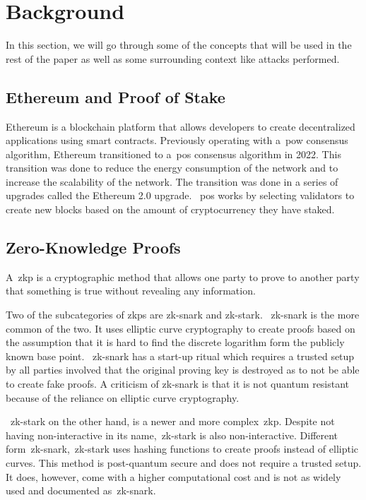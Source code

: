 
\section{Background}\label{sec:background}
In this section, we will go through some of the concepts that will be used in the rest of the paper as well as some surrounding context like attacks performed.

\subsection{Ethereum and Proof of Stake}\label{subsec:ethereum-and-proof-of-stake}
Ethereum is a blockchain platform that allows developers to create decentralized applications using smart contracts.
Previously operating with a~\gls{pow} consensus algorithm, Ethereum transitioned to a~\gls{pos} consensus algorithm in 2022.
This transition was done to reduce the energy consumption of the network and to increase the scalability of the network.
The transition was done in a series of upgrades called the Ethereum 2.0 upgrade.
~\gls{pos} works by selecting validators to create new blocks based on the amount of cryptocurrency they have staked.

\subsection{Zero-Knowledge Proofs}\label{subsec:zero-knowledge-proofs}
A~\gls{zkp} is a cryptographic method that allows one party to prove to another party that something is true without revealing any information.

Two of the subcategories of \gls{zkp}s are \gls{zk-snark} and \gls{zk-stark}.
~\gls{zk-snark} is the more common of the two.
It uses elliptic curve cryptography to create proofs based on the assumption that it is hard to find the discrete logarithm form the publicly known base point.
~\gls{zk-snark} has a start-up ritual which requires a trusted setup by all parties involved that the original proving key is destroyed as to not be able to create fake proofs.
A criticism of \gls{zk-snark} is that it is not quantum resistant because of the reliance on elliptic curve cryptography.

~\gls{zk-stark} on the other hand, is a newer and more complex~\gls{zkp}.
Despite not having non-interactive in its name,~\gls{zk-stark} is also non-interactive.
Different form~\gls{zk-snark},~\gls{zk-stark} uses hashing functions to create proofs instead of elliptic curves.
This method is post-quantum secure and does not require a trusted setup.
It does, however, come with a higher computational cost and is not as widely used and documented as~\gls{zk-snark}.
